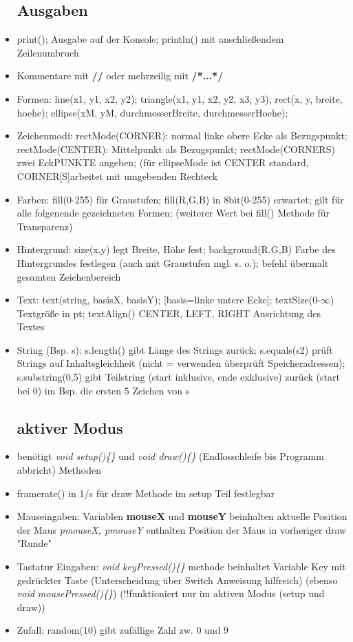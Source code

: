 \documentclass[12pt,landscape]{article}
\begin{document}
\begin{multicols}{3}
\begin{itemize}
\subsection{Ausgaben}
\item print(); Ausgabe auf der Konsole; println() mit anschließendem Zeilenumbruch
\item Kommentare mit \textbf{//} oder mehrzeilig mit \textbf{/*...*/}
\item Formen: line(x1, y1, x2, y2); triangle(x1, y1, x2, y2, x3, y3); rect(x, y, breite, hoehe); ellipse(xM, yM, durchmesserBreite, durchmesserHoehe);
\item Zeichenmodi: rectMode(CORNER): normal linke obere Ecke als Bezugspunkt; rectMode(CENTER): Mittelpunkt als Bezugspunkt; rectMode(CORNERS) zwei EckPUNKTE angeben; (für ellipseMode ist CENTER standard, CORNER[S]arbeitet mit umgebenden Rechteck
\item Farben: fill(0-255) für Graustufen; fill(R,G,B) in 8bit(0-255) erwartet; gilt für alle folgenende gezeichneten Formen; (weiterer Wert bei fill() Methode für Transparenz) 
\item Hintergrund: size(x,y) legt Breite, Höhe fest; background(R,G,B) Farbe des Hintergrundes festlegen (auch mit Graustufen mgl. s. o.); befehl übermalt gesamten Zeichenbereich
\item Text: text(string, basisX, basisY); [basis=linke untere Ecke]; textSize(0-$\infty$) Textgröße in pt; textAlign() CENTER, LEFT, RIGHT Ausrichtung des Textes 
\item String (Bsp. s): s.length() gibt Länge des Strings zurück; s.equals(s2) prüft Strings auf Inhaltsgleichheit (nicht = verwenden überprüft Speicheradressen); s.substring(0,5) gibt Teilstring (start inklusive, ende exklusive) zurück (start bei 0) im Bsp. die ersten 5 Zeichen von s
\subsection{aktiver Modus}
\item benötigt \textit{void setup()\{\}} und \textit{void draw()\{\}} (Endlosschleife bis Programm abbricht) Methoden
\item framerate() in 1/s für draw Methode im setup Teil festlegbar
\item Mauseingaben: Variablen \textbf{mouseX} und \textbf{mouseY} beinhalten aktuelle Position der Maus \textit{pmouseX, pmouseY} enthalten Position der Maus in vorheriger draw "Runde"
\item Tastatur Eingaben: \textit{void keyPressed()\{\}} methode beinhaltet Variable Key mit gedrückter Taste (Unterscheidung über Switch Anweisung hilfreich) (ebenso \textit{void mousePressed()\{\}}) (!!funktioniert nur im aktiven Modus (setup und draw))
\item Zufall: random(10) gibt zufällige Zahl zw. 0 und 9

\end{itemize}
\end{multicols}
\end{document}
